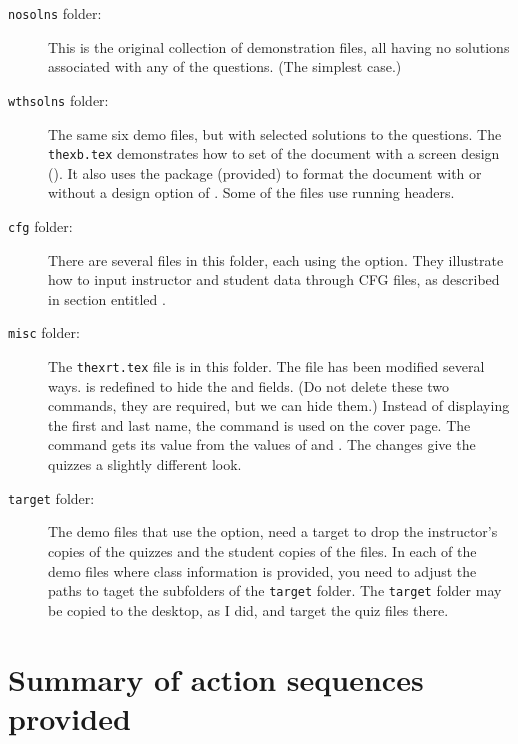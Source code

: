 \documentclass{article}
\begin{document}
\begin{description}
   \item [\texttt{nosolns} folder:] This is the original collection of demonstration files,
       all having no solutions associated with any of the questions. (The
       simplest case.)
  \item [\texttt{wthsolns} folder:] The same six demo files, but with selected solutions to
      the questions. The \texttt{thexb.tex} demonstrates how to set of the
      document with a screen design (). It also uses the
       package (provided) to format the document with or without
      a design option of . Some of the files use running headers.
  \item[\texttt{cfg} folder:] There are several files in this folder, each
      using the  option. They illustrate how to input
      instructor and student data through CFG files, as described in
      section entitled .
  \item[\texttt{misc} folder:] The \texttt{thexrt.tex} file is in this
      folder. The file has been modified several ways.
       is redefined to hide the  and
       fields. (Do not delete these two commands, they are
      required, but we can hide them.) Instead of displaying the first and
      last name, the  command is used on the cover page. The
       command gets its value from the values of
       and . The changes give the quizzes a
      slightly different look.
  \item[\texttt{target} folder:] The demo files that use the 
      option, need a target to drop the instructor's copies of the quizzes
      and the student copies of the files. In each of the demo files where
      class information is provided, you need to adjust the paths to taget
      the subfolders of the \texttt{target} folder. The \texttt{target}
      folder may be copied to the desktop, as I did, and target the quiz
      files there.
\end{description}

\section{Summary of action sequences provided}\label{actSeq}
\end{document}
